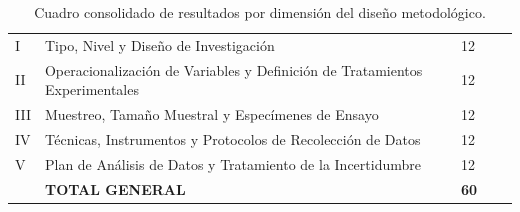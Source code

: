 \begin{table}[htbp]
\centering
\scriptsize
\caption{Cuadro consolidado de resultados por dimensión del diseño metodológico.}\label{tab:consolidado-metodologia}
\begin{tabularx}{\textwidth}{|C{0.8cm}|L{7.5cm}|C{1.8cm}|C{1.8cm}|X|}
\hline
{}
 &  &  &  &  \\ \hline
I & Tipo, Nivel y Diseño de Investigación & 12 & & \\ \hline
{}
II & Operacionalización de Variables y Definición de Tratamientos Experimentales & 12 & & \\ \hline
III & Muestreo, Tamaño Muestral y Especímenes de Ensayo & 12 & & \\ \hline
{}
IV & Técnicas, Instrumentos y Protocolos de Recolección de Datos & 12 & & \\ \hline
V & Plan de Análisis de Datos y Tratamiento de la Incertidumbre & 12 & & \\ \hline
{}
& \textbf{TOTAL GENERAL} & \textbf{60} & & \\ \hline
\end{tabularx}
\normalsize
\end{table}

